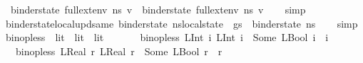 \begin{isabellebody}
\ \ binder{\isacharunderscore}{\kern0pt}state\ {\isacharparenleft}{\kern0pt}full{\isacharunderscore}{\kern0pt}ext{\isacharunderscore}{\kern0pt}env\ ns{}\ v{\isacharparenright}{\kern0pt}\ {\isacharequal}{\kern0pt}\ binder{\isacharunderscore}{\kern0pt}state\ {\isacharparenleft}{\kern0pt}full{\isacharunderscore}{\kern0pt}ext{\isacharunderscore}{\kern0pt}env\ ns{}\ v{\isacharparenright}{\kern0pt}{\isachardoublequoteclose}\isanewline
%
\isadelimproof
\ \ %
\endisadelimproof
%
\isatagproof
{}\isamarkupfalse%
\ simp%
\endisatagproof
{\isafoldproof}%
%
\isadelimproof
\isanewline
%
\endisadelimproof
\isanewline
{}\isamarkupfalse%
\ binder{\isacharunderscore}{\kern0pt}state{\isacharunderscore}{\kern0pt}local{\isacharunderscore}{\kern0pt}upd{\isacharunderscore}{\kern0pt}same{\isacharcolon}{\kern0pt}\ {\isachardoublequoteopen}binder{\isacharunderscore}{\kern0pt}state\ {\isacharparenleft}{\kern0pt}ns{\isasymlparr}local{\isacharunderscore}{\kern0pt}state\ {\isacharcolon}{\kern0pt}{\isacharequal}{\kern0pt}\ gs{\isasymrparr}{\isacharparenright}{\kern0pt}\ {\isacharequal}{\kern0pt}\ binder{\isacharunderscore}{\kern0pt}state\ ns{\isachardoublequoteclose}\isanewline
%
\isadelimproof
\ \ %
\endisadelimproof
%
\isatagproof
{}\isamarkupfalse%
\ simp%
\endisatagproof
{\isafoldproof}%
%
\isadelimproof
%
\endisadelimproof
%
\isadelimdocument
%
\endisadelimdocument
%
\isatagdocument
%
\isamarkuptrue%
%
\endisatagdocument
{\isafolddocument}%
%
\isadelimdocument
%
\endisadelimdocument
{}\isamarkupfalse%
\ binop{\isacharunderscore}{\kern0pt}less\ {\isacharcolon}{\kern0pt}{\isacharcolon}{\kern0pt}\ {\isachardoublequoteopen}lit\ {\isasymRightarrow}\ lit\ {\isasymrightharpoonup}\ lit{\isachardoublequoteclose}\isanewline
\ \ \isanewline
\ \ \ \ {\isachardoublequoteopen}binop{\isacharunderscore}{\kern0pt}less\ {\isacharparenleft}{\kern0pt}LInt\ i{}{\isacharparenright}{\kern0pt}\ {\isacharparenleft}{\kern0pt}LInt\ i{}{\isacharparenright}{\kern0pt}\ {\isacharequal}{\kern0pt}\ Some\ {\isacharparenleft}{\kern0pt}LBool\ {\isacharparenleft}{\kern0pt}i{}\ {\isacharless}{\kern0pt}\ i{}{\isacharparenright}{\kern0pt}{\isacharparenright}{\kern0pt}{\isachardoublequoteclose}\isanewline
\ \ {\isacharbar}{\kern0pt}\ {\isachardoublequoteopen}binop{\isacharunderscore}{\kern0pt}less\ {\isacharparenleft}{\kern0pt}LReal\ r{}{\isacharparenright}{\kern0pt}\ {\isacharparenleft}{\kern0pt}LReal\ r{}{\isacharparenright}{\kern0pt}\ {\isacharequal}{\kern0pt}\ Some\ {\isacharparenleft}{\kern0pt}LBool\ {\isacharparenleft}{\kern0pt}r{}\ {\isacharless}{\kern0pt}\ r{}{\isacharparenright}{\kern0pt}{\isacharparenright}{\kern0pt}{\isachardoublequoteclose}\isanewline

\end{isabellebody}

